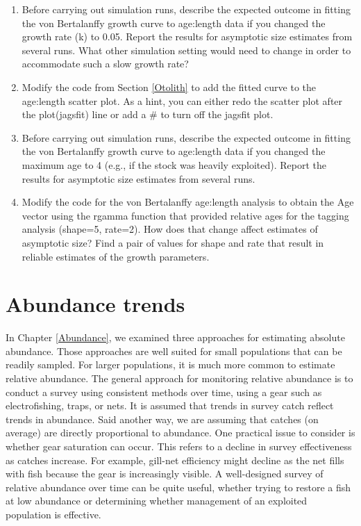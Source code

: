 \documentclass[
]{krantz}
\begin{document}
\begin{enumerate}
\def\labelenumi{\arabic{enumi}.}
\item
  Before carrying out simulation runs, describe the expected outcome in fitting the von Bertalanffy growth curve to age:length data if you changed the growth rate (k) to 0.05. Report the results for asymptotic size estimates from several runs. What other simulation setting would need to change in order to accommodate such a slow growth rate?
\item
  Modify the code from Section \ref{Otolith} to add the fitted curve to the age:length scatter plot. As a hint, you can either redo the scatter plot after the plot(jagsfit) line or add a \# to turn off the jagsfit plot.
\item
  Before carrying out simulation runs, describe the expected outcome in fitting the von Bertalanffy growth curve to age:length data if you changed the maximum age to 4 (e.g., if the stock was heavily exploited). Report the results for asymptotic size estimates from several runs.
\item
  Modify the code for the von Bertalanffy age:length analysis to obtain the Age vector using the rgamma function that provided relative ages for the tagging analysis (shape=5, rate=2). How does that change affect estimates of asymptotic size? Find a pair of values for shape and rate that result in reliable estimates of the growth parameters.
\end{enumerate}

\hypertarget{Trend}{%
\chapter{Abundance trends}\label{Trend}}

In Chapter \ref{Abundance}, we examined three approaches for estimating absolute abundance. Those approaches are well suited for small populations that can be readily sampled. For larger populations, it is much more common to estimate relative abundance. The general approach for monitoring relative abundance is to conduct a survey using consistent methods over time, using a gear such as electrofishing, traps, or nets. It is assumed that trends in survey catch reflect trends in abundance. Said another way, we are assuming that catches (on average) are directly proportional to abundance. One practical issue to consider is whether gear saturation can occur. This refers to a decline in survey effectiveness as catches increase. For example, gill-net efficiency might decline as the net fills with fish because the gear is increasingly visible. A well-designed survey of relative abundance over time can be quite useful, whether trying to restore a fish at low abundance or determining whether management of an exploited population is effective.
\end{document}
